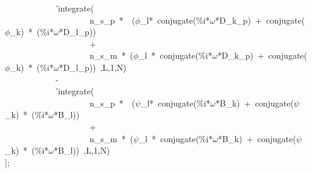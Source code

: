 \documentclass[fleqn]{article}
\begin{document}
\begin{minipage}[t]{\textwidth}
\ \ \ \ \ \ \ \ \ \ \ \ 'integrate(\ \\
\ \ \ \ \ \ \ \ \ \ \ \ \ \ \ \ \ \ \ \ n\_s\_p\ *\ \ (\ensuremath{\phi}\_l*\ conjugate(\%i*\ensuremath{\omega}*D\_k\_p)\ +\ conjugate(\ensuremath{\phi}\_k)\ *\ (\%i*\ensuremath{\omega}*D\_l\_p))\\
\ \ \ \ \ \ \ \ \ \ \ \ \ \ \ \ \ \ \ \ +\ \\
\ \ \ \ \ \ \ \ \ \ \ \ \ \ \ \ \ \ \ \ n\_s\_m\ *\ (\ensuremath{\phi}\_l\ *\ conjugate(\%i*\ensuremath{\omega}*D\_k\_p)\ +\ conjugate(\ensuremath{\phi}\_k)\ *\ (\%i*\ensuremath{\omega}*D\_l\_p))\ ,L,1,N)\\
\ \ \ \ \ \ \ \ \ \ \ \ -\\
\ \ \ \ \ \ \ \ \ \ \ \ 'integrate(\ \\
\ \ \ \ \ \ \ \ \ \ \ \ \ \ \ \ \ \ \ \ n\_s\_p\ *\ \ (\ensuremath{\psi}\_l*\ conjugate(\%i*\ensuremath{\omega}*B\_k)\ +\ conjugate(\ensuremath{\psi}\_k)\ *\ (\%i*\ensuremath{\omega}*B\_l))\\
\ \ \ \ \ \ \ \ \ \ \ \ \ \ \ \ \ \ \ \ +\ \\
\ \ \ \ \ \ \ \ \ \ \ \ \ \ \ \ \ \ \ \ n\_s\_m\ *\ (\ensuremath{\psi}\_l\ *\ conjugate(\%i*\ensuremath{\omega}*B\_k)\ +\ conjugate(\ensuremath{\psi}\_k)\ *\ (\%i*\ensuremath{\omega}*B\_l))\ ,L,1,N)\\
];
\end{minipage}
\end{document}
